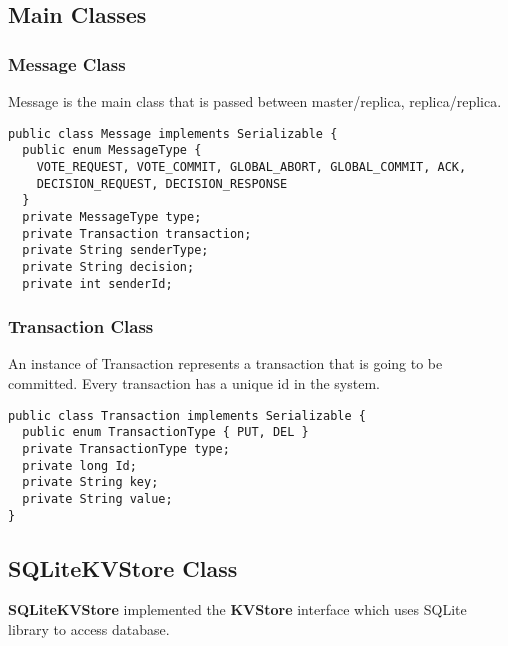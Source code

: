 \documentclass[11pt, oneside]{article}   	%
\begin{document}
\subsection{Main Classes}
\subsubsection{Message Class}
Message is the main class that is passed between master/replica, replica/replica.
\begin{verbatim}               
public class Message implements Serializable {
  public enum MessageType {
    VOTE_REQUEST, VOTE_COMMIT, GLOBAL_ABORT, GLOBAL_COMMIT, ACK, 
    DECISION_REQUEST, DECISION_RESPONSE
  }
  private MessageType type;
  private Transaction transaction;
  private String senderType;
  private String decision;
  private int senderId;
\end{verbatim}

\subsubsection{Transaction Class}
An instance of Transaction represents a transaction that is going to be committed.
Every transaction has a unique id in the system.
\begin{verbatim}
public class Transaction implements Serializable {
  public enum TransactionType { PUT, DEL }  
  private TransactionType type;
  private long Id;
  private String key;
  private String value;
}
\end{verbatim}

\subsection{SQLiteKVStore Class}
{\bf SQLiteKVStore} implemented the {\bf KVStore} interface which uses SQLite library to access database.
\end{document}
